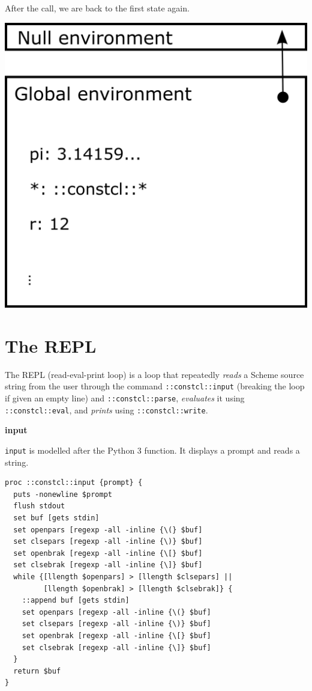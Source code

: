 \documentclass[twoside,9pt]{report}
\begin{document}
After the call, we are back to the first state again.

\includegraphics{images/env1.png}
\chapter{The REPL}
\label{the-repl}


The REPL (read-eval-print loop) is a loop that repeatedly \emph{reads} a Scheme source string from the user through the command \texttt{::constcl::input} (breaking the loop if given an empty line) and \texttt{::constcl::parse}, \emph{evaluates} it using \texttt{::constcl::eval}, and \emph{prints} using \texttt{::constcl::write}.



\textbf{input}


\texttt{input} is modelled after the Python 3 function. It displays a prompt and reads a string.

\begin{lstlisting}
proc ::constcl::input {prompt} {
  puts -nonewline $prompt
  flush stdout
  set buf [gets stdin]
  set openpars [regexp -all -inline {\(} $buf]
  set clsepars [regexp -all -inline {\)} $buf]
  set openbrak [regexp -all -inline {\[} $buf]
  set clsebrak [regexp -all -inline {\]} $buf]
  while {[llength $openpars] > [llength $clsepars] ||
         [llength $openbrak] > [llength $clsebrak]} {
    ::append buf [gets stdin]
    set openpars [regexp -all -inline {\(} $buf]
    set clsepars [regexp -all -inline {\)} $buf]
    set openbrak [regexp -all -inline {\[} $buf]
    set clsebrak [regexp -all -inline {\]} $buf]
  }
  return $buf
}
\end{lstlisting}
\end{document}
